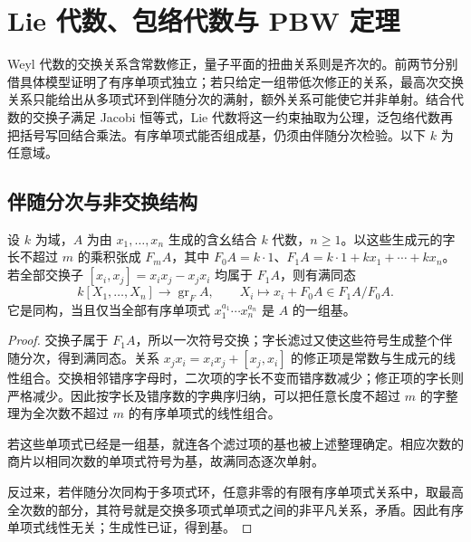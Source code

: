 
%
%

\section{Lie 代数、包络代数与 PBW 定理}
\label{b2:sec:2004}

Weyl 代数的交换关系含常数修正，量子平面的扭曲关系则是齐次的。前两节分别借具体模型证明了有序单项式独立；若只给定一组带低次修正的关系，最高次交换关系只能给出从多项式环到伴随分次的满射，额外关系可能使它并非单射。结合代数的交换子满足 Jacobi 恒等式，Lie 代数将这一约束抽取为公理，泛包络代数再把括号写回结合乘法。有序单项式能否组成基，仍须由伴随分次检验。以下 \(k\) 为任意域。


\subsection{伴随分次与非交换结构}
\label{b2:subsec:2004:01}

\begin{proposition}\label{b2:prop:pbw-filtered-criterion}
	设 \(k\) 为域，\(A\) 为由 \(x_1,\ldots,x_n\) 生成的含幺结合 \(k\) 代数，\(n\geq1\)。以这些生成元的字长不超过 \(m\) 的乘积张成 \(F_mA\)，其中 \(F_0A=k\cdot1\)、\(F_1A=k\cdot1+kx_1+\cdots+kx_n\)。若全部交换子 \([x_i,x_j]=x_ix_j-x_jx_i\) 均属于 \(F_1A\)，则有满同态
	\[
		k[X_1,\ldots,X_n]\longrightarrow\operatorname{gr}_F A, \qquad X_i\longmapsto x_i+F_0A\in F_1A/F_0A.
	\]
	它是同构，当且仅当全部有序单项式 \(x_1^{a_1}\cdots x_n^{a_n}\) 是 \(A\) 的一组基。
\end{proposition}
\begin{proof}
	交换子属于 \(F_1A\)，所以一次符号交换；字长滤过又使这些符号生成整个伴随分次，得到满同态。关系 \(x_jx_i=x_ix_j+[x_j,x_i]\) 的修正项是常数与生成元的线性组合。交换相邻错序字母时，二次项的字长不变而错序数减少；修正项的字长则严格减少。因此按字长及错序数的字典序归纳，可以把任意长度不超过 \(m\) 的字整理为全次数不超过 \(m\) 的有序单项式的线性组合。

	若这些单项式已经是一组基，就连各个滤过项的基也被上述整理确定。相应次数的商片以相同次数的单项式符号为基，故满同态逐次单射。

	反过来，若伴随分次同构于多项式环，任意非零的有限有序单项式关系中，取最高全次数的部分，其符号就是交换多项式单项式之间的非平凡关系，矛盾。因此有序单项式线性无关；生成性已证，得到基。
\end{proof}

